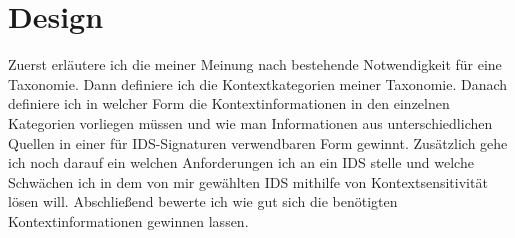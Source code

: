 \chapter{Design}%
\label{cha:design}

Zuerst erläutere ich die meiner Meinung nach bestehende Notwendigkeit für eine Taxonomie. Dann definiere ich die Kontextkategorien meiner Taxonomie. Danach definiere ich in welcher Form die Kontextinformationen in den einzelnen Kategorien vorliegen müssen und wie man Informationen aus unterschiedlichen Quellen in einer für IDS-Signaturen verwendbaren Form gewinnt. Zusätzlich gehe ich noch darauf ein welchen Anforderungen ich an ein IDS stelle und welche Schwächen ich in dem von mir gewählten IDS mithilfe von Kontextsensitivität lösen will. Abschließend bewerte ich wie gut sich die benötigten Kontextinformationen gewinnen lassen. 


